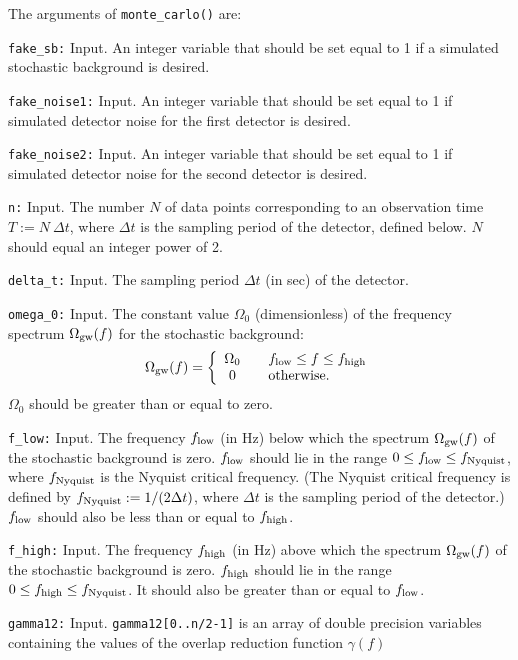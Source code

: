 The arguments of {\tt monte\_carlo()} are:
\begin{description}
%
\item{\tt fake\_sb:} Input.
An integer variable that should be set equal to 1 if a simulated
stochastic background is desired.
%
\item{\tt fake\_noise1:} Input.
An integer variable that should be set equal to 1 if simulated detector
noise for the first detector is desired.
%
\item{\tt fake\_noise2:} Input.
An integer variable that should be set equal to 1 if simulated detector
noise for the second detector is desired.
%
\item{\tt n:} Input. 
The number $N$ of data points corresponding to an observation
time $T:=N\ \Delta t$, where
$\Delta t$ is the sampling period of the detector, defined below.
$N$ should equal an integer power of 2.
%
\item{\tt delta\_t:} Input.  
The sampling period $\Delta t$ (in sec) of the detector. 
%
\item{\tt omega\_0:} Input.  
The constant value $\Omega_0$ (dimensionless) of the frequency 
spectrum $\Omega_{\rm gw}(f)$ for the stochastic background:
%
\[
\Omega_{\rm gw}(f)=\left\{
\begin{array}{cl}
\Omega_0 & \quad f_{\rm low}\le f \le f_{\rm high}\\
0        & \quad {\rm otherwise.}
\end{array}
\right.
\]
%
$\Omega_0$ should be greater than or equal to zero.
%
\item{\tt f\_low:} Input.  
The frequency $f_{\rm low}$ (in Hz) below which the spectrum 
$\Omega_{\rm gw}(f)$ of the stochastic background is zero.
$f_{\rm low}$ should lie in the range $0\le f_{\rm low}\le f_{\rm Nyquist}$, 
where $f_{\rm Nyquist}$ is the Nyquist critical frequency. 
(The Nyquist critical frequency is defined by 
$f_{\rm Nyquist}:=1/(2\Delta t)$, 
where $\Delta t$ is the sampling period of the detector.)
$f_{\rm low}$ should also be less than or equal to $f_{\rm high}$.
%
\item{\tt f\_high:} Input.  
The frequency $f_{\rm high}$ (in Hz) above which the spectrum 
$\Omega_{\rm gw}(f)$ of the stochastic background is zero.
$f_{\rm high}$ should lie in the range $0\le f_{\rm high}\le f_{\rm Nyquist}$.
It should also be greater than or equal to $f_{\rm low}$.
%
\item{\tt gamma12:} Input.
{\tt gamma12[0..n/2-1]} is an array of double precision variables 
containing the values of the overlap reduction function $\gamma(f)$ 

\end{description}
